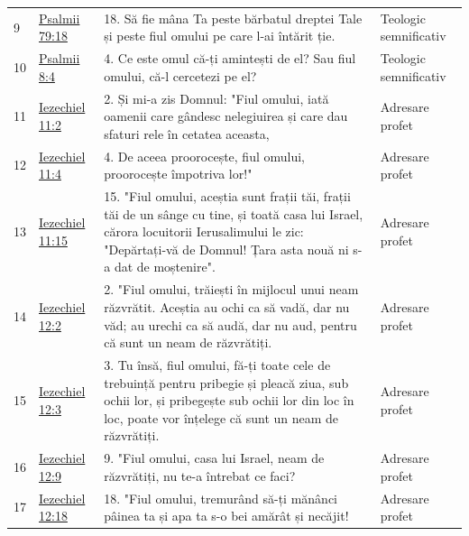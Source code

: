 \documentclass[12pt,a4paper,twoside,openany]{book}
\begin{document}
\begin{longtable}{L{0.8cm}L{1.2cm}L{11.9cm}L{0.8cm}}
9 & \href{https://bibliaortodoxa.ro/carte.php?id=65\&cap=79\#18}{Psalmii 79:18} & 18. Să fie mâna Ta peste bărbatul dreptei Tale și peste fiul omului pe care l-ai întărit ție. & Teologic semnificativ \\
10 & \href{https://bibliaortodoxa.ro/carte.php?id=65\&cap=8\#4}{Psalmii 8:4} & 4. Ce este omul că-ți amintești de el? Sau fiul omului, că-l cercetezi pe el? & Teologic semnificativ \\
11 & \href{https://bibliaortodoxa.ro/carte.php?id=33\&cap=11\#2}{Iezechiel 11:2} & 2. Și mi-a zis Domnul: "Fiul omului, iată oamenii care gândesc nelegiuirea și care dau sfaturi rele în cetatea aceasta, & Adresare profet \\
12 & \href{https://bibliaortodoxa.ro/carte.php?id=33\&cap=11\#4}{Iezechiel 11:4} & 4. De aceea proorocește, fiul omului, proorocește împotriva lor!" & Adresare profet \\
13 & \href{https://bibliaortodoxa.ro/carte.php?id=33\&cap=11\#15}{Iezechiel 11:15} & 15. "Fiul omului, aceștia sunt frații tăi, frații tăi de un sânge cu tine, și toată casa lui Israel, cărora locuitorii Ierusalimului le zic: "Depărtați-vă de Domnul! Țara asta nouă ni s-a dat de moștenire". & Adresare profet \\
14 & \href{https://bibliaortodoxa.ro/carte.php?id=33\&cap=12\#2}{Iezechiel 12:2} & 2. "Fiul omului, trăiești în mijlocul unui neam răzvrătit. Aceștia au ochi ca să vadă, dar nu văd; au urechi ca să audă, dar nu aud, pentru că sunt un neam de răzvrătiți. & Adresare profet \\
15 & \href{https://bibliaortodoxa.ro/carte.php?id=33\&cap=12\#3}{Iezechiel 12:3} & 3. Tu însă, fiul omului, fă-ți toate cele de trebuință pentru pribegie și pleacă ziua, sub ochii lor, și pribegește sub ochii lor din loc în loc, poate vor înțelege că sunt un neam de răzvrătiți. & Adresare profet \\
16 & \href{https://bibliaortodoxa.ro/carte.php?id=33\&cap=12\#9}{Iezechiel 12:9} & 9. "Fiul omului, casa lui Israel, neam de răzvrătiți, nu te-a întrebat ce faci? & Adresare profet \\
17 & \href{https://bibliaortodoxa.ro/carte.php?id=33\&cap=12\#18}{Iezechiel 12:18} & 18. "Fiul omului, tremurând să-ți mănânci pâinea ta și apa ta s-o bei amărât și necăjit! & Adresare profet \\

\end{longtable}
\end{document}
